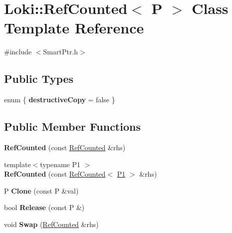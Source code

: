\hypertarget{classLoki_1_1RefCounted}{}\section{Loki\+:\+:Ref\+Counted$<$ P $>$ Class Template Reference}
\label{classLoki_1_1RefCounted}


{\ttfamily \#include $<$Smart\+Ptr.\+h$>$}

\subsection*{Public Types}
\begin{DoxyCompactItemize}
\item 
\hypertarget{classLoki_1_1RefCounted_a1181ae0801a9276668475f8d18a0fa29}{}enum \{ {\bfseries destructive\+Copy} = false
 \}\label{classLoki_1_1RefCounted_a1181ae0801a9276668475f8d18a0fa29}

\end{DoxyCompactItemize}
\subsection*{Public Member Functions}
\begin{DoxyCompactItemize}
\item 
\hypertarget{classLoki_1_1RefCounted_ad496effe6906b55a30aefdf6eca9282b}{}{\bfseries Ref\+Counted} (const \hyperlink{classLoki_1_1RefCounted}{Ref\+Counted} \&rhs)\label{classLoki_1_1RefCounted_ad496effe6906b55a30aefdf6eca9282b}

\item 
\hypertarget{classLoki_1_1RefCounted_a352024d8a4a810dd8743f3f43f3a9d8e}{}{\footnotesize template$<$typename P1 $>$ }\\{\bfseries Ref\+Counted} (const \hyperlink{classLoki_1_1RefCounted}{Ref\+Counted}$<$ \hyperlink{structP1}{P1} $>$ \&rhs)\label{classLoki_1_1RefCounted_a352024d8a4a810dd8743f3f43f3a9d8e}

\item 
\hypertarget{classLoki_1_1RefCounted_a1cdaca98b6a0484a15a1931dc109e983}{}P {\bfseries Clone} (const P \&val)\label{classLoki_1_1RefCounted_a1cdaca98b6a0484a15a1931dc109e983}

\item 
\hypertarget{classLoki_1_1RefCounted_a81ac222422ff875dbffd6ababef8f02e}{}bool {\bfseries Release} (const P \&)\label{classLoki_1_1RefCounted_a81ac222422ff875dbffd6ababef8f02e}

\item 
\hypertarget{classLoki_1_1RefCounted_adcf6ea58e099227676b5c114f241b4a9}{}void {\bfseries Swap} (\hyperlink{classLoki_1_1RefCounted}{Ref\+Counted} \&rhs)\label{classLoki_1_1RefCounted_adcf6ea58e099227676b5c114f241b4a9}

\end{DoxyCompactItemize}


